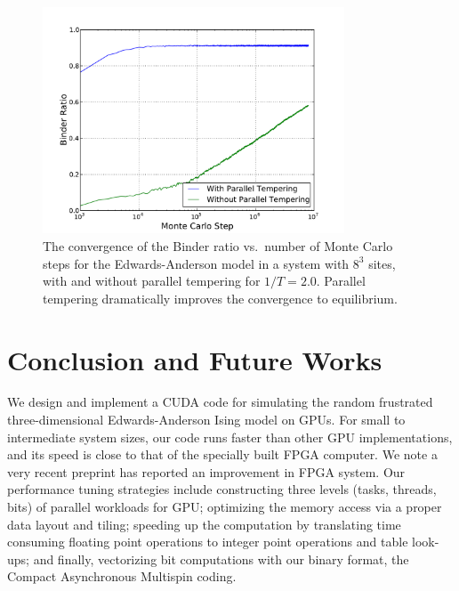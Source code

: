   \begin{figure}[ht!]
    \centering
    \includegraphics[width=0.8\textwidth]{img/qvst.pdf}
    \caption{The convergence of the Binder ratio vs.\ number of Monte Carlo steps for the Edwards-Anderson
      model in a system with $8^3$ sites, 
    with and without parallel tempering for  $1/T=2.0$.  Parallel tempering dramatically improves 
    the convergence to equilibrium.}
    \label{fig:qvst}
    \end{figure}








\section{Conclusion and Future Works}

We design and implement a CUDA code for simulating the random frustrated
three-dimensional Edwards-Anderson Ising model on GPUs. 
For small to intermediate system sizes, our code runs faster than other
GPU implementations, and its speed is close to that of the specially built FPGA
computer. We note a very recent	preprint has reported an improvement in FPGA system. \cite{TheJanusCollaboration:2012:JFS:2322156.2322158}
Our performance tuning strategies include constructing three
levels (tasks, threads, bits) of parallel workloads for GPU;
optimizing the memory access via a proper data layout and tiling; 
speeding up the computation by translating time consuming floating point
operations to integer point operations and table look-ups; and finally,
vectorizing bit computations with our binary format, the Compact Asynchronous Multispin coding.

